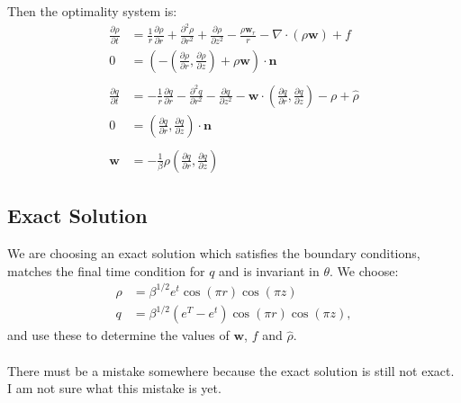 \documentclass[11pt, a4paper]{article}
\theoremstyle{definition}
\newcommand{\w}{\mathbf{w}}
\newcommand{\n}{\mathbf{n}}
\newcommand{\hr}{\widehat \rho}
\begin{document}
	Then the optimality system is:
	\begin{align*}
		\frac{\partial \rho}{\partial t} &= \frac{1}{r} \frac{\partial \rho}{\partial r} +  \frac{\partial^2 \rho}{\partial r^2} + \frac{\partial \rho}{\partial z^2} - \frac{\rho\w_r}{r} - \nabla \cdot (\rho \w ) + f\\
		0 &= \left(- \left(\frac{\partial \rho}{\partial r},  \frac{\partial \rho}{\partial z}\right) + \rho \w \right) \cdot \n \\
		\\
		\frac{\partial q}{\partial t} &= - \frac{1}{r} \frac{\partial q}{\partial r} -  \frac{\partial^2 q}{\partial r^2} - \frac{\partial q}{\partial z^2} - \w \cdot \left(\frac{\partial q}{\partial r},  \frac{\partial q}{\partial z}\right) - \rho + \hr\\
		0 &= \left(\frac{\partial q}{\partial r},  \frac{\partial q}{\partial z}\right) \cdot \n \\
		\\
		\w &= - \frac{1}{\beta}\rho  \left(\frac{\partial q}{\partial r},  \frac{\partial q}{\partial z}\right)
	\end{align*}
	
	\subsection{Exact Solution}
	We are choosing an exact solution which satisfies the boundary conditions, matches the final time condition for $q$ and is invariant in $\theta$. We choose:
	\begin{align*}
		\rho &= \beta^{1/2} e^t \cos(\pi r) \cos (\pi z)\\
		q &= \beta^{1/2}(e^T - e^t)\cos(\pi r)\cos(\pi z),
	\end{align*}
	and use these to determine the values of $\w$, $f$ and $\hr$.
	\\
	\\
	There must be a mistake somewhere because the exact solution is still not exact. I am not sure what this mistake is yet.
	
\end{document}
